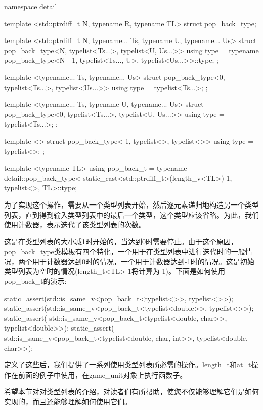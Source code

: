 \begin{cpp}
namespace detail
{
	template <std::ptrdiff_t N, typename R, typename TL>
	struct pop_back_type;
	
	template <std::ptrdiff_t N, typename... Ts,
			  typename U, typename... Us>
	struct pop_back_type<N, typelist<Ts...>,
							typelist<U, Us...>>
	{
		using type =
			typename pop_back_type<N - 1,
									typelist<Ts..., U>,
									typelist<Us...>>::type;
	};

	template <typename... Ts, typename... Us>
	struct pop_back_type<0, typelist<Ts...>,
							typelist<Us...>>
	{
		using type = typelist<Ts...>;
	};

	template <typename... Ts, typename U, typename... Us>
	struct pop_back_type<0, typelist<Ts...>,
							typelist<U, Us...>>
	{
		using type = typelist<Ts...>;
	};

	template <>
	struct pop_back_type<-1, typelist<>, typelist<>>
	{
		using type = typelist<>;
	};
}

template <typename TL>
using pop_back_t = typename detail::pop_back_type<
	static_cast<std::ptrdiff_t>(length_v<TL>)-1,
				typelist<>, TL>::type;
\end{cpp}

为了实现这个操作，需要从一个类型列表开始，然后逐元素递归地构造另一个类型列表，直到得到输入类型列表中的最后一个类型，这个类型应该省略。为此，我们使用计数器，表示迭代了该类型列表的次数。

这是在类型列表的大小减1时开始的，当达到0时需要停止。由于这个原因，pop\_back\_type类模板有四个特化，一个用于在类型列表中进行迭代时的一般情况，两个用于计数器达到0时的情况，一个用于计数器达到-1时的情况。这是初始类型列表为空时的情况(length\_t<TL>-1将计算为-1)。下面是如何使用pop\_back\_t的演示:

\begin{cpp}
static_assert(std::is_same_v<pop_back_t<typelist<>>,
							 typelist<>>);
static_assert(std::is_same_v<pop_back_t<typelist<double>>,
							 typelist<>>);
static_assert(
	std::is_same_v<pop_back_t<typelist<double, char>>,
							  typelist<double>>);
static_assert(
	std::is_same_v<pop_back_t<typelist<double, char, int>>,
							  typelist<double, char>>);
\end{cpp}

定义了这些后，我们提供了一系列使用类型列表所必需的操作。length\_t和at\_t操作在前面的例子中使用，在game\_unit对象上执行函数子。

希望本节对对类型列表的介绍，对读者们有所帮助，使您不仅能够理解它们是如何实现的，而且还能够理解如何使用它们。



















